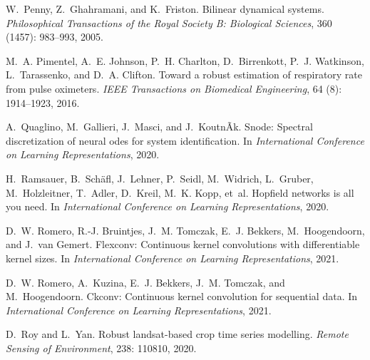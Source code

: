 \documentclass{MITcsail}
\begin{document}
\begin{thebibliography}{96}
W.~Penny, Z.~Ghahramani, and K.~Friston.
\newblock Bilinear dynamical systems.
\newblock \emph{Philosophical Transactions of the Royal Society B: Biological
  Sciences}, 360 (1457): 983--993, 2005.

M.~A. Pimentel, A.~E. Johnson, P.~H. Charlton, D.~Birrenkott, P.~J. Watkinson,
  L.~Tarassenko, and D.~A. Clifton.
\newblock Toward a robust estimation of respiratory rate from pulse oximeters.
\newblock \emph{IEEE Transactions on Biomedical Engineering}, 64
  (8): 1914--1923, 2016.

A.~Quaglino, M.~Gallieri, J.~Masci, and J.~KoutnÃ­k.
\newblock Snode: Spectral discretization of neural odes for system
  identification.
\newblock In \emph{International Conference on Learning Representations}, 2020.

H.~Ramsauer, B.~Sch{\"a}fl, J.~Lehner, P.~Seidl, M.~Widrich, L.~Gruber,
  M.~Holzleitner, T.~Adler, D.~Kreil, M.~K. Kopp, et~al.
\newblock Hopfield networks is all you need.
\newblock In \emph{International Conference on Learning Representations}, 2020.

D.~W. Romero, R.-J. Bruintjes, J.~M. Tomczak, E.~J. Bekkers, M.~Hoogendoorn,
  and J.~van Gemert.
\newblock Flexconv: Continuous kernel convolutions with differentiable kernel
  sizes.
\newblock In \emph{International Conference on Learning Representations},
  2021{}.

D.~W. Romero, A.~Kuzina, E.~J. Bekkers, J.~M. Tomczak, and M.~Hoogendoorn.
\newblock Ckconv: Continuous kernel convolution for sequential data.
\newblock In \emph{International Conference on Learning Representations},
  2021{}.

D.~Roy and L.~Yan.
\newblock Robust landsat-based crop time series modelling.
\newblock \emph{Remote Sensing of Environment}, 238: 110810, 2020.


\end{thebibliography}
\end{document}
